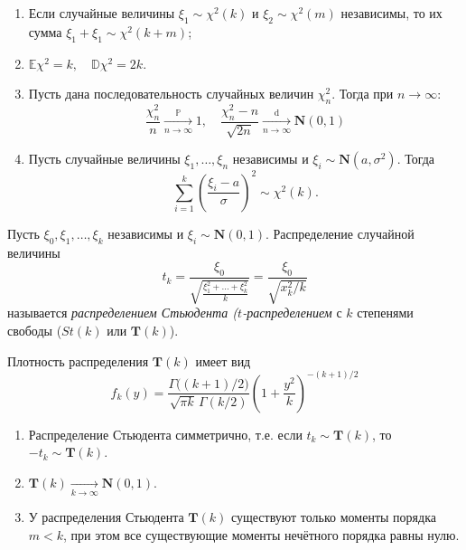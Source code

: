 \begin{namedthm}\leavevmode
\begin{enumerate}
    \item Если случайные величины $\xi_1 \sim \chi^{2}(k)$ и $\xi_2 \sim \chi^{2}(m)$ независимы, то их сумма $\xi_1+\xi_1 \sim \chi^{2}(k+m)$;
    \item $\mathbb{E} \chi^{2}=k, \quad \mathbb{D} \chi^{2}=2 k$.
    \item Пусть дана последовательность случайных величин $\chi_{n}^{2}$. Тогда при $n \to \infty$:
    \begin{equation*}
        \frac{\chi_{n}^{2}}{n} \xrightarrow[n \to \infty]{\mathbb{P}} 1, 
        \quad \frac{\chi_{n}^{2}-n}{\sqrt{2 n}} \xrightarrow[n \to \infty]{\text{d}} \mathbf{N}(0,1)
    \end{equation*}
    \item Пусть случайные величины $\xi_1, \ldots, \xi_n$ независимы и $\xi_i \sim \mathbf{N}(a,\sigma^{2})$. Тогда
    \begin{equation*}
        \sum\limits_{i=1}^{k}\left(\frac{\xi_{i}-a}{\sigma}\right)^{2} \sim \chi^{2}(k).
    \end{equation*}
\end{enumerate}
\end{namedthm}

\begin{defn}
    Пусть $\xi_{0}, \xi_{1}, \ldots, \xi_{k}$ независимы и $\xi_i \sim \mathbf{N}(0,1)$. Распределение случайной величины
    \begin{equation*}
        t_{k}
        = \frac{\xi_{0}}{\sqrt{\frac{\xi_{1}^{2} + \ldots + \xi_{k}^{2}}{k}}} 
        = \frac{\xi_0}{\sqrt{x_{k}^{2} / k}}
    \end{equation*}
    называется \textit{распределением Стьюдента ($t$-распределением} с $k$ степенями свободы ($St(k)$ или $\mathbf{T}(k)$).
\end{defn}
Плотность распределения $\mathbf{T}(k)$ имеет вид
\begin{equation*}
    f_{k}(y)=\frac{\Gamma\bigl((k+1) / 2\bigr)}{\sqrt{\pi k} \, \Gamma(k / 2)}\left(1+\frac{y^{2}}{k}\right)^{-(k+1) / 2}
\end{equation*}

\begin{namedthm}\leavevmode
\begin{enumerate}
    \item Распределение Стьюдента симметрично, т.е. если $t_k \sim \mathbf{T}(k)$, то $-t_k \sim \mathbf{T}(k)$.
    \item $\mathbf{T}(k) \xrightarrow[k \to \infty]{} \mathbf{N}(0,1)$.
    \item У распределения Стьюдента $\mathbf{T}(k)$ существуют только моменты порядка $m < k$, при этом все существующие моменты нечётного порядка равны нулю.
\end{enumerate}
\end{namedthm}

